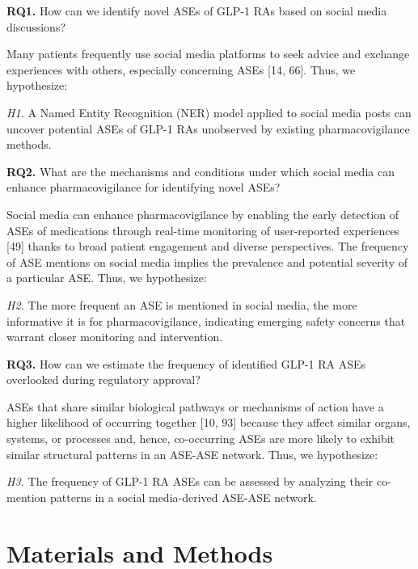 \documentclass[referee,bst/sn-basic]{sn-jnl}%
\begin{document}
\textbf{RQ1.} 
How can we identify novel ASEs of GLP-1 RAs based on social media discussions?

Many patients frequently use social media platforms to seek advice and exchange experiences with others, especially concerning ASEs [14, 66]. 
Thus, we hypothesize:

\textit{H1.} 
A Named Entity Recognition (NER) model applied to social media posts can uncover potential ASEs of GLP-1 RAs unobserved by existing pharmacovigilance methods.

\textbf{RQ2.} 
What are the mechanisms and conditions under which social media can enhance pharmacovigilance for identifying novel ASEs?

Social media can enhance pharmacovigilance by enabling the early detection of ASEs of medications through real-time monitoring of user-reported experiences [49] 
thanks to broad patient engagement and diverse perspectives.
The frequency of ASE mentions on social media implies the prevalence and potential severity of a particular ASE. 
Thus, we hypothesize:

\textit{H2.}
The more frequent an ASE is mentioned in social media, the more informative it is for pharmacovigilance, indicating emerging safety concerns that warrant closer monitoring and intervention.

\textbf{RQ3.} 
How can we estimate the frequency of identified GLP-1 RA ASEs overlooked during regulatory approval?

ASEs that share similar biological pathways or mechanisms of action have a higher likelihood of occurring together [10, 93] 
because they affect similar organs, systems, or processes and, hence, co-occurring ASEs are more likely to exhibit similar structural patterns in an ASE-ASE network. 
Thus, we hypothesize:

\textit{H3.} 
The frequency of GLP-1 RA ASEs can be assessed by analyzing their co-mention patterns in a social media-derived ASE-ASE network.



\section{Materials and Methods}
\label{sec: material}
\end{document}
